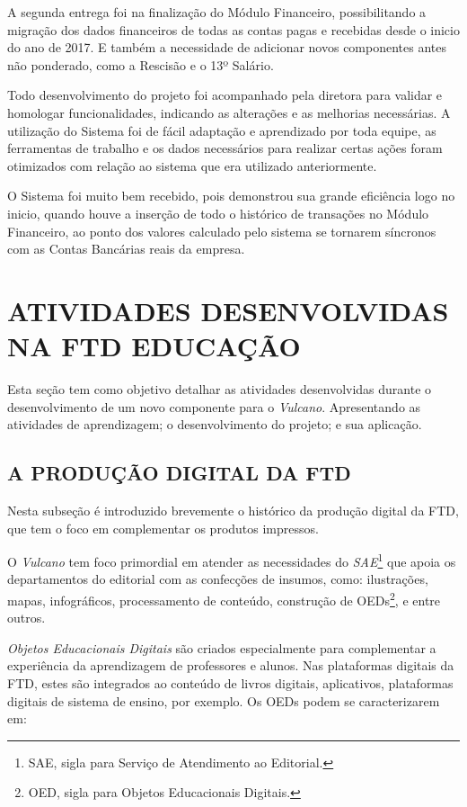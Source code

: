 \documentclass[
  12pt,            %
  openany,
  oneside,
  a4paper,         %
  english,      %
  brazil
]{article}
\numberwithin{figure}{section}
\numberwithin{table}{section}
\begin{document}
A segunda entrega foi na finalização do Módulo Financeiro, possibilitando a migração dos dados financeiros de todas as contas pagas e recebidas desde o inicio do ano de 2017. E também a necessidade de adicionar novos componentes antes não ponderado, como a Rescisão e o 13º Salário.

Todo desenvolvimento do projeto foi acompanhado pela diretora para validar e homologar funcionalidades, indicando as alterações e as melhorias necessárias. A utilização do Sistema foi de fácil adaptação e aprendizado por toda equipe, as ferramentas de trabalho e os dados necessários para realizar certas ações foram otimizados com relação ao sistema que era utilizado anteriormente.

O Sistema foi muito bem recebido, pois demonstrou sua grande eficiência logo no inicio, quando houve a inserção de todo o histórico de transações no Módulo Financeiro, ao ponto dos valores calculado pelo sistema se tornarem síncronos com as Contas Bancárias reais da empresa.






\clearpage
\section{ATIVIDADES DESENVOLVIDAS NA FTD EDUCAÇÃO}

Esta seção tem como objetivo detalhar as atividades desenvolvidas durante o desenvolvimento de um novo componente para o \textit{Vulcano}. Apresentando as atividades de aprendizagem; o desenvolvimento do projeto; e sua aplicação.

\subsection{A PRODUÇÃO DIGITAL DA FTD}

Nesta subseção é introduzido brevemente o histórico da produção digital da FTD, que tem o foco em complementar os produtos impressos.

O \textit{Vulcano} tem foco primordial em atender as necessidades do \textit{SAE}\footnote{SAE, sigla para Serviço de Atendimento ao Editorial.} que apoia os departamentos do editorial com as confecções de insumos, como: ilustrações, mapas, infográficos, processamento de conteúdo, construção de OEDs\footnote{OED, sigla para Objetos Educacionais Digitais.}, e entre outros.

\textit{Objetos Educacionais Digitais} são criados especialmente para complementar a experiência da aprendizagem de professores e alunos. Nas plataformas digitais da FTD, estes são integrados ao conteúdo de livros digitais, aplicativos, plataformas digitais de sistema de ensino, por exemplo. Os OEDs podem se caracterizarem em:
\end{document}
